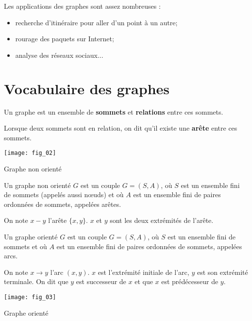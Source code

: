 Les applications des graphes sont assez nombreuses :
\begin{itemize}
 \item recherche d'itinéraire pour aller d'un point à un autre;
 \item rourage des paquets sur Internet;
 \item analyse des réseaux sociaux...
 \end{itemize}
 

\section{Vocabulaire des graphes}

\begin{defi}[Graphe]%
Un graphe est un ensemble de \textbf{sommets} et  \textbf{relations} entre ces sommets.

Lorsque deux sommets sont en relation, on dit qu'il existe une \textbf{arête} entre ces sommets.
\end{defi}

\begin{marginfigure}
\texttt{[image: fig\_02]}

\caption{Graphe non orienté \label{fig_02}}
\end{marginfigure}


\begin{defi}
Un graphe non orienté $G$ est un couple $G=(S,A)$, où $S$ est un ensemble fini de sommets (appelés aussi n\oe uds)  et où $A$ est un ensemble fini de paires ordonnées de sommets, appelées arêtes.

On note $x - y$ l'arête $\{x,y\}$. $x$ et $y$ sont les deux extrémités de l'arête.
\end{defi}



\begin{defi}\cite{ref_01}
Un graphe orienté $G$ est un couple $G=(S,A)$, où $S$ est un ensemble fini de sommets et où $A$ est un ensemble fini de paires ordonnées de sommets, appelées arcs.

On note $x\to y$ l'arc $(x,y)$. $x$ est l'extrémité initiale de l'arc, $y$ est son extrémité terminale. On dit que $y$ est successeur de $x$ et que $x$ est prédécesseur de $y$. 
\end{defi}




\begin{marginfigure}
\texttt{[image: fig\_03]}

\caption{Graphe orienté}
\label{fig_03}
\end{marginfigure}

